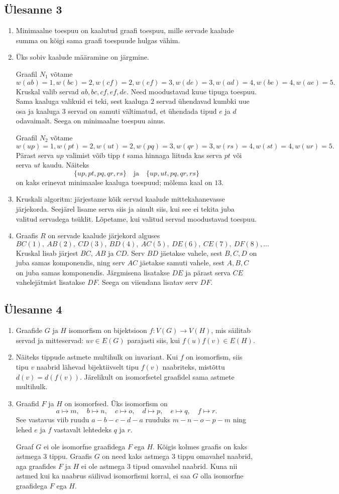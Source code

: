\documentclass[11pt,a4paper]{article}
\newcommand{\yl}[1]{\subsection*{Ülesanne #1}}
\begin{document}
\yl{3}
\begin{enumerate}[label=\alph*.]
\item Minimaalne toespuu on kaalutud graafi toespuu, mille servade kaalude summa on kõigi sama graafi toespuude hulgas vähim.
\item Üks sobiv kaalude määramine on järgmine.

Graafil $N_1$ võtame
\[
 w(ab)=1,
 w(bc)=2,
 w(cf)=2,
 w(ef)=3,
 w(de)=3,
 w(ad)=4,
 w(be)=4,
 w(ae)=5.
\]
Kruskal valib servad $ab,bc,cf,ef,de$. Need moodustavad kuue tipuga toespuu. Sama kaaluga valikuid ei teki, sest kaaluga $2$ servad ühendavad kumbki uue osa ja kaaluga $3$ servad on samuti vältimatud, et ühendada tipud $e$ ja $d$ odavaimalt. Seega on minimaalne toespuu ainus.

Graafil $N_2$ võtame
\[
 w(up)=1,
 w(pt)=2,
 w(ut)=2,
 w(pq)=3,
 w(qr)=3,
 w(rs)=4,
 w(st)=4,
 w(ur)=5.
\]
Pärast serva $up$ valimist võib tipp $t$ sama hinnaga liituda kas serva $pt$ või serva $ut$ kaudu. Näiteks
\[
\{up,pt,pq,qr,rs\}
\quad\text{ja}\quad
\{up,ut,pq,qr,rs\}
\]
on kaks erinevat minimaalse kaaluga toespuud; mõlema kaal on $13$.
\item Kruskali algoritm: järjestame kõik servad kaalude mittekahanevasse järjekorda. Seejärel lisame serva siis ja ainult siis, kui see ei tekita juba valitud servadega tsüklit. Lõpetame, kui valitud servad moodustavad toespuu.
\item Graafis $R$ on servade kaalude järjekord alguses
\[
BC(1),\ AB(2),\ CD(3),\ BD(4),\ AC(5),\ DE(6),\ CE(7),\ DF(8),\ldots
\]
Kruskal lisab järjest $BC$, $AB$ ja $CD$. Serv $BD$ jäetakse vahele, sest $B,C,D$ on juba samas komponendis, ning serv $AC$ jäetakse samuti vahele, sest $A,B,C$ on juba samas komponendis. Järgmisena lisatakse $DE$ ja pärast serva $CE$ vahelejätmist lisatakse $DF$. Seega on viiendana lisatav serv $DF$.
\end{enumerate}

\yl{4}
\begin{enumerate}[label=\alph*.]
\item Graafide $G$ ja $H$ isomorfism on bijektsioon $f:V(G)\to V(H)$, mis säilitab servad ja mitteservad: $uv\in E(G)$ parajasti siis, kui $f(u)f(v)\in E(H)$.
\item Näiteks tippude astmete multihulk on invariant. Kui $f$ on isomorfism, siis tipu $v$ naabrid lähevad bijektiivselt tipu $f(v)$ naabriteks, mistõttu $d(v)=d(f(v))$. Järelikult on isomorfsetel graafidel sama astmete multihulk.
\item Graafid $F$ ja $H$ on isomorfsed. Üks isomorfism on
\[
a\mapsto m,
\quad b\mapsto n,
\quad c\mapsto o,
\quad d\mapsto p,
\quad e\mapsto q,
\quad f\mapsto r.
\]
See vastavus viib ruudu $a-b-c-d-a$ ruuduks $m-n-o-p-m$ ning lehed $e$ ja $f$ vastavalt lehtedeks $q$ ja $r$.

Graaf $G$ ei ole isomorfne graafidega $F$ ega $H$. Kõigis kolmes graafis on kaks astmega $3$ tippu. Graafis $G$ on need kaks astmega $3$ tippu omavahel naabrid, aga graafides $F$ ja $H$ ei ole astmega $3$ tipud omavahel naabrid. Kuna nii astmed kui ka naabrus säilivad isomorfismi korral, ei saa $G$ olla isomorfne graafidega $F$ ega $H$.
\end{enumerate}
\end{document}
